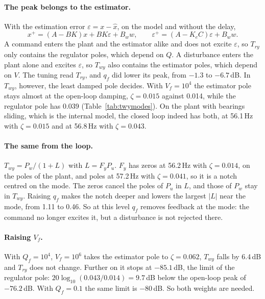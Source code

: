 \documentclass[10pt,a4paper]{article}
\numberwithin{equation}{section}
\begin{document}
\paragraph{The peak belongs to the estimator.} With the estimation error $\varepsilon=x-\hat x$, on the model and without the delay,
\begin{equation}
x^+=(A-BK)x+BK\varepsilon+B_ww,\qquad\varepsilon^+=(A-K_eC)\varepsilon+B_ww.
\end{equation}
A command enters the plant and the estimator alike and does not excite $\varepsilon$, so $T_{ry}$ only contains the regulator poles, which depend on $Q$. A disturbance enters the plant alone and excites $\varepsilon$, so $T_{wy}$ also contains the estimator poles, which depend on $V$. The tuning read $T_{ry}$, and $q_f$ did lower its peak, from $-1.3$ to $-6.7$\,dB. In $T_{wy}$, however, the least damped pole decides. With $V_f=10^4$ the estimator pole stays almost at the open-loop damping, $\zeta=0.015$ against 0.014, while the regulator pole has 0.039 (Table~\ref{tab:twymodes}). On the plant with bearings sliding, which is the internal model, the closed loop indeed has both, at 56.1\,Hz with $\zeta=0.015$ and at 56.8\,Hz with $\zeta=0.043$.

\paragraph{The same from the loop.} $T_{wy}=P_w/(1+L)$ with $L=F_yP_u$. $F_y$ has zeros at 56.2\,Hz with $\zeta=0.014$, on the poles of the plant, and poles at 57.2\,Hz with $\zeta=0.041$, so it is a notch centred on the mode. The zeros cancel the poles of $P_u$ in $L$, and those of $P_w$ stay in $T_{wy}$. Raising $q_f$ makes the notch deeper and lowers the largest $|L|$ near the mode, from 1.11 to 0.46. So at this level $q_f$ removes feedback at the mode: the command no longer excites it, but a disturbance is not rejected there.

\paragraph{Raising $V_f$.} With $Q_f=10^4$, $V_f=10^6$ takes the estimator pole to $\zeta=0.062$, $T_{wy}$ falls by 6.4\,dB and $T_{ry}$ does not change. Further on it stops at $-85.1$\,dB, the limit of the regulator pole: $20\log_{10}(0.043/0.014)=9.7$\,dB below the open-loop peak of $-76.2$\,dB. With $Q_f=0.1$ the same limit is $-80$\,dB. So both weights are needed.
\end{document}
